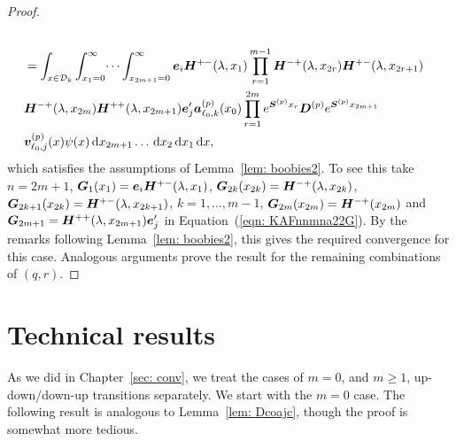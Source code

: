 \begin{proof}
\begin{align*}
		\\&=\int_{x\in\mathcal{D}_k}\int_{x_1=0}^\infty \dots \int_{x_{2m+1}=0}^\infty \boldsymbol e_i \boldsymbol H^{+-}(\lambda,x_1)\prod_{r=1}^{m-1}\boldsymbol H^{-+}(\lambda,x_{2r}) \boldsymbol H^{+-}(\lambda,x_{2r+1}) \\&\boldsymbol H^{-+}(\lambda,x_{2m}) 
		\boldsymbol H^{++}(\lambda,x_{2m+1})\boldsymbol e_j'{} \nonumber
		\boldsymbol a_{\ell_0,k}^{(p)}(x_0)\prod_{r=1}^{2m} e^{\boldsymbol{S}^{(p)}x_{r}}\boldsymbol{D}^{(p)} e^{\boldsymbol{S}^{(p)}x_{2m+1}}
		\\& {\boldsymbol v}_{\ell_0,j}^{(p)}(x)\psi(x)\, \mathrm{d} x_{2m+1}\dots\, \mathrm{d} x_2 \, \mathrm{d} x_1 \, \mathrm{d} x,
	\end{align*}
	which satisfies the assumptions of Lemma~\ref{lem: boobies2}. To see this take \(n=2m+1\), \(\boldsymbol G_1(x_1) = \boldsymbol e_i\boldsymbol H^{+-}(\lambda, x_1)\), \(\boldsymbol G_{2k}(x_{2k}) = \boldsymbol H^{-+}(\lambda, x_{2k})\), \(\boldsymbol G_{2k+1}(x_{2k}) = \boldsymbol H^{+-}(\lambda, x_{2k+1})\), \(k=1,\dots,m-1\), \(\boldsymbol G_{2m}(x_{2m}) = \boldsymbol H^{-+}(x_{2m})\) and \(\boldsymbol G_{2m+1} = \boldsymbol H^{++}(\lambda,x_{2m+1})\boldsymbol e_j'{}\) in Equation~(\ref{eqn: KAFnnmna22G}). By the remarks following Lemma~\ref{lem: boobies2}, this gives the required convergence for this case. Analogous arguments prove the result for the remaining combinations of \((q,r)\). 
\end{proof}

\section{Technical results}
As we did in Chapter~\ref{sec: conv}, we treat the cases of \(m=0\), and \(m\geq 1\), up-down/down-up transitions separately. We start with the \(m=0\) case. The following result is analogous to Lemma~\ref{lem: Dcoajc}, though the proof is somewhat more tedious. 

